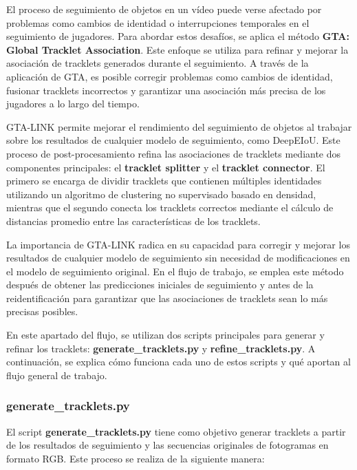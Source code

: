 \documentclass[12pt, a4paper, twoside]{article}
\begin{document}
	El proceso de seguimiento de objetos en un vídeo puede verse afectado por problemas como cambios de identidad o interrupciones temporales en el seguimiento de jugadores. Para abordar estos desafíos, se aplica el método \textbf{GTA: Global Tracklet Association}. Este enfoque se utiliza para refinar y mejorar la asociación de tracklets generados durante el seguimiento. A través de la aplicación de GTA, es posible corregir problemas como cambios de identidad, fusionar tracklets incorrectos y garantizar una asociación más precisa de los jugadores a lo largo del tiempo.
	
	GTA-LINK permite mejorar el rendimiento del seguimiento de objetos al trabajar sobre los resultados de cualquier modelo de seguimiento, como DeepEIoU. Este proceso de post-procesamiento refina las asociaciones de tracklets mediante dos componentes principales: el \textbf{tracklet splitter} y el \textbf{tracklet connector}. El primero se encarga de dividir tracklets que contienen múltiples identidades utilizando un algoritmo de clustering no supervisado basado en densidad, mientras que el segundo conecta los tracklets correctos mediante el cálculo de distancias promedio entre las características de los tracklets.
	
	La importancia de GTA-LINK radica en su capacidad para corregir y mejorar los resultados de cualquier modelo de seguimiento sin necesidad de modificaciones en el modelo de seguimiento original. En el flujo de trabajo, se emplea este método después de obtener las predicciones iniciales de seguimiento y antes de la reidentificación para garantizar que las asociaciones de tracklets sean lo más precisas posibles.
	
	
	En este apartado del flujo, se utilizan dos scripts principales para generar y refinar los tracklets: \textbf{generate\_tracklets.py} y \textbf{refine\_tracklets.py}. A continuación, se explica cómo funciona cada uno de estos scripts y qué aportan al flujo general de trabajo.
	
	\subsubsection{generate\_tracklets.py}
	
	El script \textbf{generate\_tracklets.py} tiene como objetivo generar tracklets a partir de los resultados de seguimiento y las secuencias originales de fotogramas en formato RGB. Este proceso se realiza de la siguiente manera:
	
\end{document}
